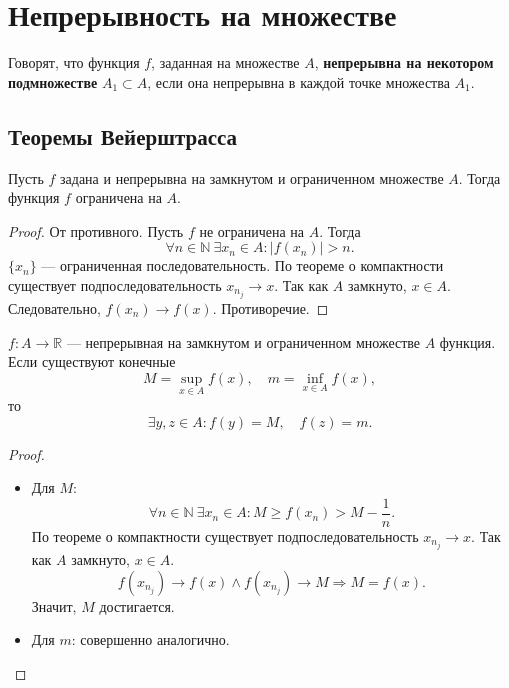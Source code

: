 \documentclass[11pt]{book}
\newcommand{\N}{\mathbb{N}}
\newcommand{\R}{\mathbb{R}}
\renewcommand{\ge}{\geqslant}
\theoremstyle{definition}
\theoremstyle{plain}
\theoremstyle{plain}
\theoremstyle{definition}
\theoremstyle{remark}
\begin{document}
\section{Непрерывность на множестве}
\begin{defn}
    Говорят, что функция $ f$, заданная на множестве $ A$,  {\bf непрерывна на некотором подмножестве} $ A_1 \subset A$, если она непрерывна в каждой точке множества $ A_1$.
\end{defn}
\subsection{Теоремы Вейерштрасса}
\begin{thm}
    Пусть $ f$ задана и непрерывна на замкнутом и ограниченном множестве  $ A$. Тогда функция  $ f$ ограничена на  $ A$.
\end{thm}
\begin{proof}
    От противного. Пусть $ f$ не ограничена на $ A$. Тогда
    \[
	\forall n \in \N ~ \exists x_{n} \in A: |f(x_{n})|>n
    .\]
    $ \{x_{n}\}$ --- ограниченная последовательность. По теореме о компактности существует подпоследовательность $ x_{n_{j}} \to x$. Так как $ A$ замкнуто, $ x \in A$. Следовательно, $ f(x_{n}) \to  f(x)$. Противоречие.
\end{proof}
\begin{thm}
    $ f: A \to \R$ --- непрерывная на замкнутом и ограниченном множестве $ A$ функция. Если существуют конечные
    $$
    M = \sup_{x \in A}f(x), \quad m = \inf_{x \in A} f(x)
    ,
    $$
    то \[
	\exists y, z \in A: f(y) = M, \quad f(z) = m
    .\]
\end{thm}
\begin{proof}
    $ $
    \begin{itemize}
	\item Для $ M$:
	    \[
		\forall n \in \N ~ \exists x_{n} \in A: M \ge f(x_{n}) > M -\frac{1}{n}
	    .\]
	    По теореме о компактности существует подпоследовательность $ x_{n_{j}} \to x$. Так как $ A$ замкнуто, $ x \in A$.
	    \[
		f(x_{n_j}) \to  f(x) \wedge f(x_{n_{j}}) \to  M \Longrightarrow M = f(x)
	    .\]
	    Значит, $ M$ достигается.
	\item Для $ m$: совершенно аналогично.
    \end{itemize}
\end{proof}
\end{document}
